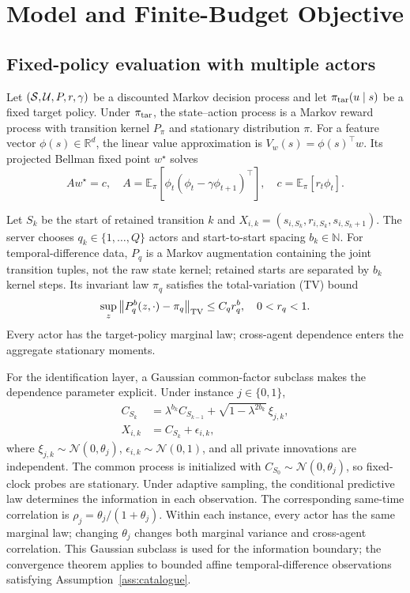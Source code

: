 \documentclass[journal]{IEEEtran}
\newcommand{\E}{\mathbb{E}}
\newcommand{\R}{\mathbb{R}}
\begin{document}
\section{Model and Finite-Budget Objective}
\subsection{Fixed-policy evaluation with multiple actors}
Let $({\cal S},{\cal U},P,r,\gamma)$ be a discounted Markov decision process and let $\pi_{\rm tar}(u\mid s)$ be a fixed target policy.
Under $\pi_{\rm tar}$, the state--action process is a Markov reward process with transition kernel $P_{\pi}$ and stationary distribution $\pi$.
For a feature vector $\phi(s)\in\R^d$, the linear value approximation is $V_w(s)=\phi(s)^\top w$.
Its projected Bellman fixed point $w^\star$ solves
\begin{equation}
A w^\star=c,
\quad
A=\E_\pi[\phi_t(\phi_t-\gamma\phi_{t+1})^\top],
\quad
c=\E_\pi[r_t\phi_t].
\label{eq:projected-fixed-point}
\end{equation}

Let $S_k$ be the start of retained transition $k$ and $X_{i,k}=(s_{i,S_k},r_{i,S_k},s_{i,S_k+1})$.
The server chooses $q_k\in\{1,\ldots,Q\}$ actors and start-to-start spacing $b_k\in\mathbb N$.
For temporal-difference data, $P_q$ is a Markov augmentation containing the joint transition tuples, not the raw state kernel; retained starts are separated by $b_k$ kernel steps.
Its invariant law $\pi_q$ satisfies the total-variation (TV) bound
\begin{equation}
\sup_z\left\|P_q^b(z,\cdot)-\pi_q\right\|_{\rm TV}\le C_qr_q^b,
\quad 0<r_q<1.
\label{eq:mixing}
\end{equation}
Every actor has the target-policy marginal law; cross-agent dependence enters the aggregate stationary moments.

For the identification layer, a Gaussian common-factor subclass makes the dependence parameter explicit.
Under instance $j\in\{0,1\}$,
\begin{align}
C_{S_k}&=\lambda^{b_k}C_{S_{k-1}}+\sqrt{1-\lambda^{2b_k}}\,\xi_{j,k},\nonumber\\
X_{i,k}&=C_{S_k}+\epsilon_{i,k},
\label{eq:common-factor}
\end{align}
where $\xi_{j,k}\sim\mathcal{N}(0,\theta_j)$, $\epsilon_{i,k}\sim\mathcal{N}(0,1)$, and all private innovations are independent.
The common process is initialized with $C_{S_0}\sim\mathcal N(0,\theta_j)$, so fixed-clock probes are stationary.
Under adaptive sampling, the conditional predictive law determines the information in each observation.
The corresponding same-time correlation is $\rho_j=\theta_j/(1+\theta_j)$.
Within each instance, every actor has the same marginal law; changing $\theta_j$ changes both marginal variance and cross-agent correlation.
This Gaussian subclass is used for the information boundary; the convergence theorem applies to bounded affine temporal-difference observations satisfying Assumption~\ref{ass:catalogue}.
\end{document}
